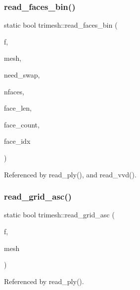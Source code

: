 \mbox{\label{namespacetrimesh_a20fe51f2d1b8a67d83f1131847b1dab5}} 
\subsubsection{\texorpdfstring{read\+\_\+faces\+\_\+bin()}{read\_faces\_bin()}}
{\footnotesize\ttfamily static bool trimesh\+::read\+\_\+faces\+\_\+bin (\begin{DoxyParamCaption}\item[{F\+I\+LE $\ast$}]{f,  }\item[{\hyperlink{classtrimesh_1_1TriMesh}{Tri\+Mesh} $\ast$}]{mesh,  }\item[{bool}]{need\+\_\+swap,  }\item[{int}]{nfaces,  }\item[{int}]{face\+\_\+len,  }\item[{int}]{face\+\_\+count,  }\item[{int}]{face\+\_\+idx }\end{DoxyParamCaption})\hspace{0.3cm}{\ttfamily [static]}}



Referenced by read\+\_\+ply(), and read\+\_\+vvd().

\mbox{\label{namespacetrimesh_a32f782399abd88ad764904720a8e351f}} 
\subsubsection{\texorpdfstring{read\+\_\+grid\+\_\+asc()}{read\_grid\_asc()}}
{\footnotesize\ttfamily static bool trimesh\+::read\+\_\+grid\+\_\+asc (\begin{DoxyParamCaption}\item[{F\+I\+LE $\ast$}]{f,  }\item[{\hyperlink{classtrimesh_1_1TriMesh}{Tri\+Mesh} $\ast$}]{mesh }\end{DoxyParamCaption})\hspace{0.3cm}{\ttfamily [static]}}



Referenced by read\+\_\+ply().

